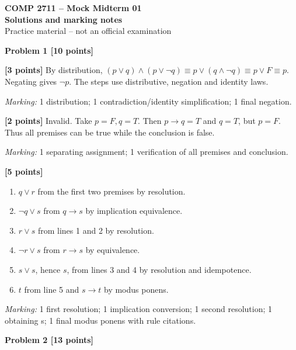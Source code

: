 \documentclass[12pt,letterpaper]{article}
\newcommand{\problemheading}[2][5\baselineskip]{\Needspace{#1}\par\noindent\hspace*{-0.625in}\textbf{#2}\par\nobreak\vspace{0.3em}}
\begin{document}
\begin{center}\textbf{COMP 2711 -- Mock Midterm 01}\\{\large\bfseries Solutions and marking notes}\\Practice material -- not an official examination\end{center}\vspace{0.5em}
\problemheading[\dimexpr 3\baselineskip+4\baselineskip\relax]{Problem 1 [10 points]}
\begin{description}[font=\normalfont,leftmargin=1.2em,labelsep=0.4em]
\item[(a)] \textbf{[3 points]} By distribution, $(p\lor q)\land(p\lor\neg q)\equiv p\lor(q\land\neg q)\equiv p\lor F\equiv p$. Negating gives $\boxed{\neg p}$. The steps use distributive, negation and identity laws.
\par\textit{Marking:} 1 distribution; 1 contradiction/identity simplification; 1 final negation.
\item[(b)] \textbf{[2 points]} Invalid. Take $p=F,q=T$. Then $p\to q=T$ and $q=T$, but $p=F$. Thus all premises can be true while the conclusion is false.
\par\textit{Marking:} 1 separating assignment; 1 verification of all premises and conclusion.
\item[(c)] \textbf{[5 points]} \begin{enumerate}\item $q\lor r$ from the first two premises by resolution.\item $\neg q\lor s$ from $q\to s$ by implication equivalence.\item $r\lor s$ from lines 1 and 2 by resolution.\item $\neg r\lor s$ from $r\to s$ by equivalence.\item $s\lor s$, hence $s$, from lines 3 and 4 by resolution and idempotence.\item $t$ from line 5 and $s\to t$ by modus ponens.\end{enumerate}
\par\textit{Marking:} 1 first resolution; 1 implication conversion; 1 second resolution; 1 obtaining s; 1 final modus ponens with rule citations.
\end{description}
\vspace{0.65em}
\problemheading[\dimexpr 3\baselineskip+4\baselineskip\relax]{Problem 2 [13 points]}
\end{document}
